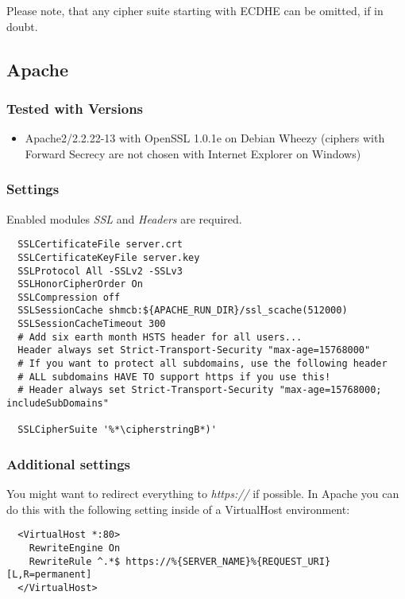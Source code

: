 Please note, that any cipher suite starting with ECDHE can be omitted, if in doubt.

\subsection{Apache}


\subsubsection{Tested with Versions}
\begin{itemize}
  \item Apache2/2.2.22-13 with OpenSSL 1.0.1e on Debian Wheezy (ciphers with Forward Secrecy are not chosen with Internet Explorer on Windows)
\end{itemize}


\subsubsection{Settings}
Enabled modules \emph{SSL} and \emph{Headers} are required.

\begin{lstlisting}
  SSLCertificateFile server.crt
  SSLCertificateKeyFile server.key
  SSLProtocol All -SSLv2 -SSLv3 
  SSLHonorCipherOrder On
  SSLCompression off
  SSLSessionCache shmcb:${APACHE_RUN_DIR}/ssl_scache(512000)
  SSLSessionCacheTimeout 300
  # Add six earth month HSTS header for all users...
  Header always set Strict-Transport-Security "max-age=15768000"
  # If you want to protect all subdomains, use the following header
  # ALL subdomains HAVE TO support https if you use this!
  # Header always set Strict-Transport-Security "max-age=15768000; includeSubDomains"

  SSLCipherSuite '%*\cipherstringB*)'
\end{lstlisting}


\subsubsection{Additional settings}
You might want to redirect everything to \emph{https://} if possible. In Apache
you can do this with the following setting inside of a VirtualHost environment:

\begin{lstlisting}
  <VirtualHost *:80>
    RewriteEngine On
    RewriteRule ^.*$ https://%{SERVER_NAME}%{REQUEST_URI} [L,R=permanent]
  </VirtualHost>
\end{lstlisting}

